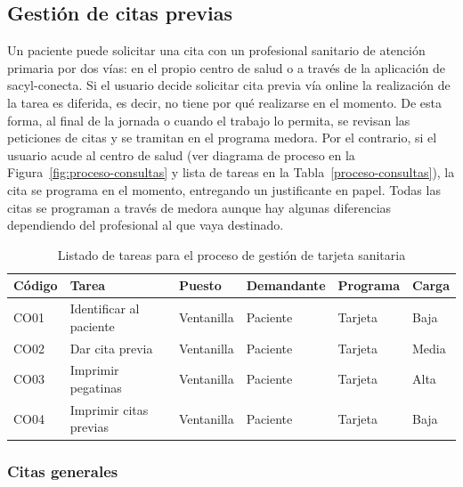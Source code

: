 \subsection{Gestión de citas previas}

Un paciente puede solicitar una cita con un profesional sanitario de atención primaria por dos vías: en el propio centro de salud o a través de la aplicación de \Gls{sacyl-conecta}.
Si el usuario decide solicitar cita previa vía online la realización de la tarea es diferida, es decir, no tiene por qué realizarse en el momento.
De esta forma, al final de la jornada o cuando el trabajo lo permita, se revisan las peticiones de citas y se tramitan en el programa \Gls{medora}.
Por el contrario, si el usuario acude al centro de salud (ver diagrama de proceso en la Figura~\ref{fig:proceso-consultas} y lista de tareas en la Tabla~\ref{proceso-consultas}), la cita se programa en el momento, entregando un justificante en papel.
Todas las citas se programan a través de \Gls{medora} aunque hay algunas diferencias dependiendo del profesional al que vaya destinado.

\begin{table}[H]
    \begin{tabular}{lp{5cm}llll}
        \toprule
        Código & Tarea                   & Puesto     & Demandante & Programa & Carga \\
        \midrule
        CO01   & Identificar al paciente & Ventanilla & Paciente   & Tarjeta  & Baja  \\
        CO02   & Dar cita previa         & Ventanilla & Paciente   & Tarjeta  & Media \\
        CO03   & Imprimir pegatinas      & Ventanilla & Paciente   & Tarjeta  & Alta  \\
        CO04   & Imprimir citas previas  & Ventanilla & Paciente   & Tarjeta  & Baja  \\
        \bottomrule
    \end{tabular}
    \caption{Listado de tareas para el proceso de gestión de tarjeta sanitaria}
    \label{tab:proceso-consulta}
\end{table}

\subsubsection{Citas generales}

